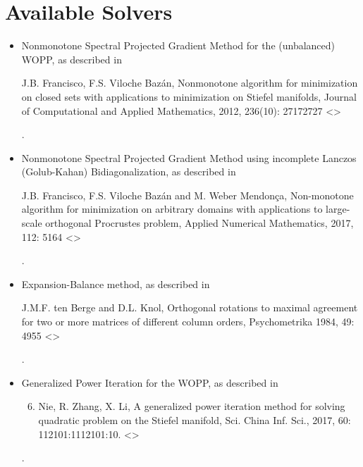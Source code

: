 \documentclass[a4paper,10pt,english]{sphinxmanual}
\begin{document}
\chapter{Available Solvers}
\label{\detokenize{index:available-solvers}}\label{\detokenize{index:scikit-procrustes}}\begin{itemize}
\item {} 
{\hyperref[\detokenize{solvers:spg}]{}}    Nonmonotone Spectral Projected Gradient Method for the (unbalanced) WOPP, as described in %
\begin{footnote}[1]\sphinxAtStartFootnote
J.B. Francisco, F.S. Viloche Bazán, Nonmonotone algorithm for minimization on closed sets with applications to minimization on Stiefel manifolds, Journal of Computational and Applied Mathematics, 2012, 236(10): 2717\textendash{}2727 \textless{}\textgreater{}
%
\end{footnote}.

\item {} 
{\hyperref[\detokenize{solvers:gkb}]{}}    Nonmonotone Spectral Projected Gradient Method using incomplete Lanczos (Golub-Kahan) Bidiagonalization, as described in %
\begin{footnote}[2]\sphinxAtStartFootnote
J.B. Francisco, F.S. Viloche Bazán and M. Weber Mendonça, Non-monotone algorithm for minimization on arbitrary domains with applications to large-scale orthogonal Procrustes problem, Applied Numerical Mathematics, 2017, 112: 51\textendash{}64 \textless{}\textgreater{}
%
\end{footnote}.

\item {} 
{\hyperref[\detokenize{solvers:eb}]{}}      Expansion-Balance method, as described in %
\begin{footnote}[3]\sphinxAtStartFootnote
J.M.F. ten Berge and D.L. Knol, Orthogonal rotations to maximal agreement for two or more matrices of different column orders, Psychometrika 1984, 49: 49\textendash{}55 \textless{}\textgreater{}
%
\end{footnote}.

\item {} 
{\hyperref[\detokenize{solvers:gpi}]{}}    Generalized Power Iteration for the WOPP, as described in %
\begin{footnote}[5]\sphinxAtStartFootnote
\begin{enumerate}
\setcounter{enumi}{5}
\item {} 
Nie, R. Zhang, X. Li, A generalized power iteration method for solving quadratic problem on the Stiefel manifold, Sci. China Inf. Sci., 2017, 60: 112101:1\textendash{}112101:10. \textless{}\textgreater{}

\end{enumerate}
%
\end{footnote}.

\end{itemize}
\end{document}
